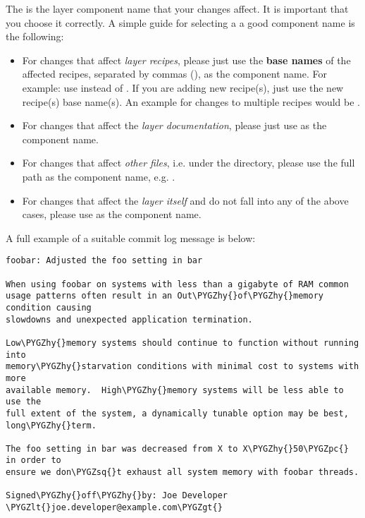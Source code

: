 \documentclass[letterpaper,10pt,english]{sphinxmanual}
\def\PYGZlt{\char`\<}
\def\PYGZgt{\char`\>}
\def\PYGZpc{\char`\%}
\def\PYGZhy{\char`\-}
\def\PYGZsq{\char`\'}
\renewcommand\PYGZsq{\textquotesingle}
\begin{document}
The  is the layer component name that your changes affect.
It is important that you choose it correctly. A simple guide for selecting a
a good component name is the following:
\begin{itemize}
\item {} 
For changes that affect \emph{layer recipes}, please just use the \textbf{base names}
of the affected recipes, separated by commas (\code{,}), as the component name.
For example: use  instead of . If you are
adding new recipe(s), just use the new recipe(s) base name(s). An example
for changes to multiple recipes would be .

\item {} 
For changes that affect the \emph{layer documentation}, please just use 
as the component name.

\item {} 
For changes that affect \emph{other files}, i.e. under the  directory,
please use the full path as the component name, e.g. .

\item {} 
For changes that affect the \emph{layer itself} and do not fall into any of
the above cases, please use  as the component name.

\end{itemize}

A full example of a suitable commit log message is below:

\begin{Verbatim}[commandchars=\\\{\}]
foobar: Adjusted the foo setting in bar

When using foobar on systems with less than a gigabyte of RAM common
usage patterns often result in an Out\PYGZhy{}of\PYGZhy{}memory condition causing
slowdowns and unexpected application termination.

Low\PYGZhy{}memory systems should continue to function without running into
memory\PYGZhy{}starvation conditions with minimal cost to systems with more
available memory.  High\PYGZhy{}memory systems will be less able to use the
full extent of the system, a dynamically tunable option may be best,
long\PYGZhy{}term.

The foo setting in bar was decreased from X to X\PYGZhy{}50\PYGZpc{} in order to
ensure we don\PYGZsq{}t exhaust all system memory with foobar threads.

Signed\PYGZhy{}off\PYGZhy{}by: Joe Developer \PYGZlt{}joe.developer@example.com\PYGZgt{}
\end{Verbatim}
\end{document}
